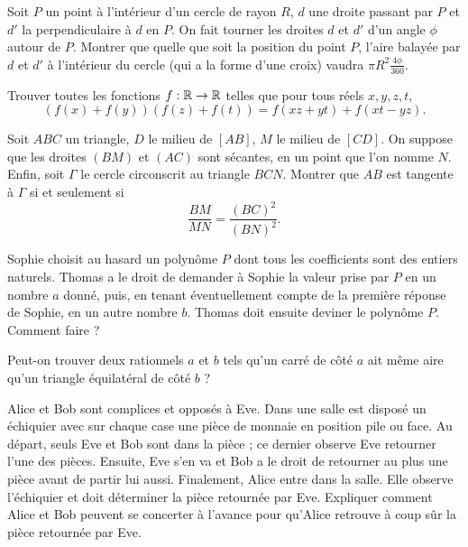 \begin{exo}{}
Soit $P$ un point à l'intérieur d'un cercle de rayon $R$, $d$ une droite passant par $P$ et $d'$ la perpendiculaire à $d$ en $P$. On fait tourner les droites $d$ et $d'$ d'un angle $\phi$ autour de $P$. Montrer que quelle que soit la position du point $P$, l'aire balayée par $d$ et $d'$ à l'intérieur du cercle (qui a la forme d'une croix) vaudra $\pi R^2 \frac{4\phi}{360}$.
\end{exo}

\begin{exo}{}Trouver toutes les fonctions $f : \mathbb R \rightarrow \mathbb R$ telles que pour tous réels $x,y,z,t$,
$$(f(x)+f(y))(f(z)+f(t))=f(xz+yt)+f(xt-yz).$$
\end{exo}

\begin{exo}{}
Soit $ABC$ un triangle, $D$ le milieu de $[AB]$, $M$ le milieu de $[CD]$. On suppose
que les droites $(BM)$ et $(AC)$ sont sécantes, en un point que l'on nomme $N$.
Enfin, soit $\Gamma$ le cercle circonscrit au triangle $BCN$.
Montrer que $AB$ est tangente à $\Gamma$ si et seulement si $$\frac{BM}{MN}
= \frac{(BC)^2}{(BN)^2}.$$
\end{exo}


\begin{exo}{}
Sophie choisit au hasard un polynôme $P$
dont tous les coefficients sont des entiers naturels. Thomas a le
droit de demander à Sophie la valeur prise par $P$ en un nombre $a$
donné, puis, en tenant éventuellement compte de la première réponse
de Sophie, en un autre nombre $b$. Thomas doit ensuite deviner le
polynôme $P$. Comment faire ? 
\end{exo}

\begin{exo}{}
Peut-on trouver deux rationnels $a$ et $b$ tels qu'un carré de côté $a$ ait même aire qu'un triangle équilatéral de côté $b$ ?
\end{exo}



\begin{exo}{}
Alice et Bob sont complices et opposés à
Eve. Dans une salle est disposé un échiquier 
avec sur chaque case une pièce de monnaie en position pile ou face.
Au départ, seuls Eve et Bob sont dans la pièce ; ce dernier observe
Eve retourner l'une des pièces. Ensuite, Eve s'en va et Bob a le droit
de retourner au plus une pièce avant de partir lui aussi. Finalement,
Alice entre dans la salle. Elle observe l'échiquier et doit déterminer
la pièce retournée par Eve. Expliquer comment Alice et Bob peuvent
se concerter à l'avance pour qu'Alice retrouve à coup sûr la pièce
retournée par Eve.
\end{exo}


